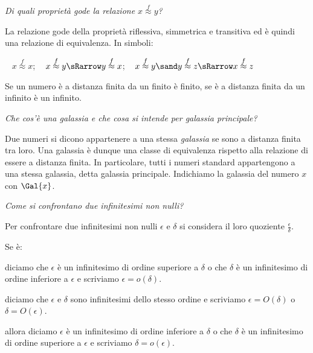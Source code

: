 \begin{esercizio}\label{ese:iper_022} 
\emph{Di quali proprietà gode la relazione \(x \stackrel{f}{\approx} y\)?}

La relazione gode della proprietà riflessiva, simmetrica e transitiva ed è 
quindi una relazione di equivalenza. In simboli:
\begin{center}
\textbullet ~ \(x \stackrel{f}{\approx} x\); \qquad 
\textbullet ~ \(x \stackrel{f}{\approx} y \sRarrow 
y \stackrel{f}{\approx} x\); \qquad 
\textbullet ~ \(x \stackrel{f}{\approx} y \sand y \stackrel{f}{\approx} z 
\sRarrow x \stackrel{f}{\approx} z\)
\end{center}
Se un numero è a distanza finita da un finito è finito, se è a distanza 
finita da un infinito è un infinito.
\end{esercizio}

\begin{esercizio}\label{ese:iper_023} 
\emph{Che cos'è una \emph{galassia} e che cosa si intende per galassia 
principale?}

Due numeri si dicono appartenere a una stessa \emph{galassia} se sono a 
distanza finita tra loro. 
Una galassia è dunque una classe di equivalenza rispetto 
alla relazione di essere a distanza finita. 
In particolare, tutti i numeri standard appartengono a una stessa galassia, 
detta galassia principale. 
Indichiamo la galassia del numero \(x\) con \(\Gal{x}\).
\end{esercizio}

\begin{esercizio}\label{ese:iper_024} 
\emph{Come si confrontano due infinitesimi non nulli?}

Per confrontare due infinitesimi non nulli \(\epsilon\) e \(\delta\) si 
considera il loro quoziente \(\frac{\epsilon}{\delta}\). 

Se è:
\begin{description} [nosep]
 \item [infinitesimo] 
diciamo che \(\epsilon\) è un infinitesimo di ordine superiore a \(\delta\) 
o che \(\delta\) è un infinitesimo di ordine inferiore a \(\epsilon\) e 
scriviamo \(\epsilon = o(\delta)\).
 \item [finito non infinitesimo] 
diciamo che \(\epsilon\) e \(\delta\) sono infinitesimi dello stesso ordine 
e scriviamo \(\epsilon = O(\delta)\) o \(\delta = O(\epsilon)\).
 \item [infinito]
allora diciamo \(\epsilon\) è un infinitesimo di ordine inferiore a 
\(\delta\) 
o che \(\delta\) è un infinitesimo di ordine superiore a \(\epsilon\) e 
scriviamo \(\delta = o(\epsilon)\).
\end{description}
\end{esercizio}

